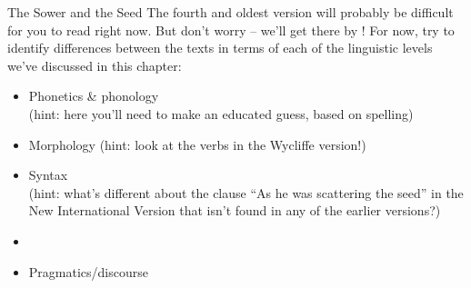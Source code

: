 \begin{exercises}{The Sower and the Seed}
\noindent The fourth and oldest version will probably be difficult for you to read right now. But don't worry -- we'll get there by ! For now, try to identify differences between the texts in terms of each of the linguistic levels we've discussed in this chapter:
\begin{itemize}
    \item Phonetics \& phonology\\ 
    (hint: here you'll need to make an educated guess, based on spelling)
    \item Morphology
    (hint: look at the verbs in the Wycliffe version!)
    \item Syntax\\
    (hint: what's different about the clause ``As he was scattering the seed'' in the New International Version that isn't found in any of the earlier versions?)
    \item {}
    \item Pragmatics/discourse
\end{itemize}
\end{exercises}

